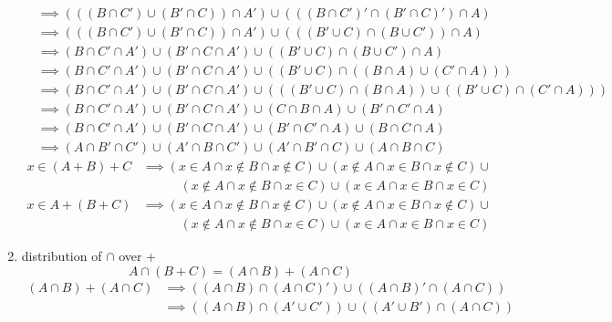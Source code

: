 \documentclass{article}
\begin{document}
\begin{enumerate}
\begin{align*}
        &\implies (((B \cap C') \cup (B' \cap C)) \cap A') \cup (((B \cap C')' \cap (B' \cap C)') \cap A)\\
        &\implies (((B \cap C') \cup (B' \cap C)) \cap A') \cup (((B' \cup C) \cap (B \cup C')) \cap A)\\
        &\implies (B \cap C' \cap A') \cup (B' \cap C \cap A') \cup ((B' \cup C) \cap (B \cup C') \cap A)\\
        &\implies (B \cap C' \cap A') \cup (B' \cap C \cap A') \cup ((B' \cup C) \cap ((B \cap A ) \cup (C' \cap A)))\\
        &\implies (B \cap C' \cap A') \cup (B' \cap C \cap A') \cup (((B' \cup C) \cap (B \cap A )) \cup ((B' \cup C) \cap (C' \cap A)))\\
        &\implies (B \cap C' \cap A') \cup (B' \cap C \cap A') \cup (C \cap B \cap A) \cup (B' \cap C' \cap A)\\
        &\implies (B \cap C' \cap A') \cup (B' \cap C \cap A') \cup (B' \cap C' \cap A) \cup (B \cap C \cap A)\\
        &\implies (A \cap B' \cap C') \cup (A' \cap B \cap C') \cup (A' \cap B' \cap C) \cup (A \cap B \cap C)
    \end{align*}
    \begin{align*}
        x \in (A + B) + C &\implies(x \in A \cap x \notin B \cap x \notin C) \cup (x \notin A \cap x \in B \cap x \notin C) \cup\\
        &\qquad\quad(x \notin A \cap x \notin B \cap x \in C) \cup (x \in A \cap x \in B \cap x \in C)
    \end{align*}
    \begin{align*}
        x \in A + (B + C) &\implies (x \in A \cap x \notin B \cap x \notin C) \cup (x \notin A \cap x \in B \cap x \notin C) \cup\\
        &\qquad\quad(x \notin A \cap x \notin B \cap x \in C) \cup (x \in A \cap x \in B \cap x \in C)
    \end{align*}
    \item distribution of $\cap$ over +
    \begin{equation*}
        A \cap (B + C) = (A \cap B) + (A \cap C)
    \end{equation*}
    \begin{align*}
        (A \cap B) + (A \cap C) &\implies ((A \cap B) \cap (A \cap C)') \cup ((A \cap B)' \cap (A \cap C))\\
        &\implies ((A \cap B) \cap (A' \cup C')) \cup ((A' \cup B') \cap (A \cap C))\\

\end{align*}
\end{enumerate}
\end{document}
